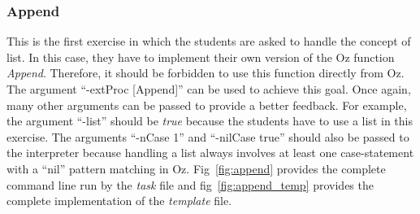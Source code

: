 \documentclass[11pt,a4paper,twoside,openright]{report}
\begin{document}
%	

\subsubsection{Append}
This is the first exercise in which the students are asked to handle the 
concept of list. In this case, they have to implement their own version of 
the Oz function \textit{Append}. Therefore, it should be forbidden to use this 
function directly from Oz. The argument \enquote{-extProc [Append]} can be used 
to achieve this goal. Once again, many other arguments can be passed to provide 
a better feedback. For example, the argument \enquote{-list} should be 
\textit{true} because the students have to use a list in this exercise. The 
arguments \enquote{-nCase 1} and \enquote{-nilCase true} should also be passed 
to the interpreter because handling a list always involves at least one 
case-statement with a \enquote{nil} pattern matching in Oz. 
Fig~\ref{fig:append} provides the complete command line run by the \textit{task} 
file and fig~\ref{fig:append_temp} provides the complete implementation of the 
\textit{template} file.
\end{document}
